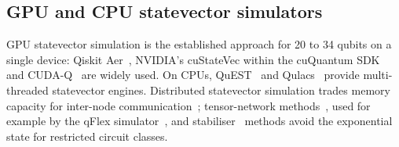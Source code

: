 \subsection{GPU and CPU statevector simulators}\label{subsec:related-gpu}

GPU statevector simulation is the established approach for 20 to 34 qubits on a single device: Qiskit Aer~\cite{qiskit2024}, NVIDIA's cuStateVec within the cuQuantum SDK~\cite{bayraktar2023cuquantum} and CUDA-Q~\cite{nvidia2024cudaq} are widely used. On CPUs, QuEST~\cite{jones2019quest} and Qulacs~\cite{suzuki2021qulacs} provide multi-threaded statevector engines. Distributed statevector simulation trades memory capacity for inter-node communication~\cite{chen2018quantum,pednault2017breaking}; tensor-network methods~\cite{vidal2003efficient,markov2008simulating}, used for example by the qFlex simulator~\cite{villalonga2019flexible}, and stabiliser~\cite{gottesman1998heisenberg,aaronson2004improved} methods avoid the exponential state for restricted circuit classes.
